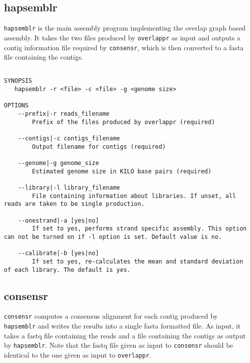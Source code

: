 \documentclass[12pt,a4paper]{report}
\begin{document}
\subsection{hapsemblr}

\texttt{hapsemblr} is the main assembly program implementing the overlap graph based assembly. It takes the two files produced by \texttt{overlappr} as input and outputs a contig information file required by \texttt{consensr}, which is then converted to a fasta file containing the contigs.

\begin{lstlisting}

SYNOPSIS
   hapsemblr -r <file> -c <file> -g <genome size>

OPTIONS 
    --prefix|-r reads_filename 
        Prefix of the files produced by overlappr (required) 

    --contigs|-c contigs_filename 
        Output filename for contigs (required) 

    --genome|-g genome_size 
        Estimated genome size in KILO base pairs (required) 

    --library|-l library_filename 
        File containing information about libraries. If unset, all reads are taken to be single production. 

    --onestrand|-a [yes|no] 
        If set to yes, performs strand specific assembly. This option can not be turned on if -l option is set. Default value is no. 

    --calibrate|-b [yes|no] 
        If set to yes, re-calculates the mean and standard deviation of each library. The default is yes. 

\end{lstlisting}

\subsection{consensr}

\texttt{consensr} computes a consensus alignment for each contig produced by \texttt{hapsemblr} and writes the results into a single fasta formatted file. As input, it takes a fastq file containing the reads and a file containing the contigs as output by \texttt{hapsemblr}. Note that the fastq file given as input to \texttt{consensr} should be identical to the one given as input to \texttt{overlappr}.
\end{document}
